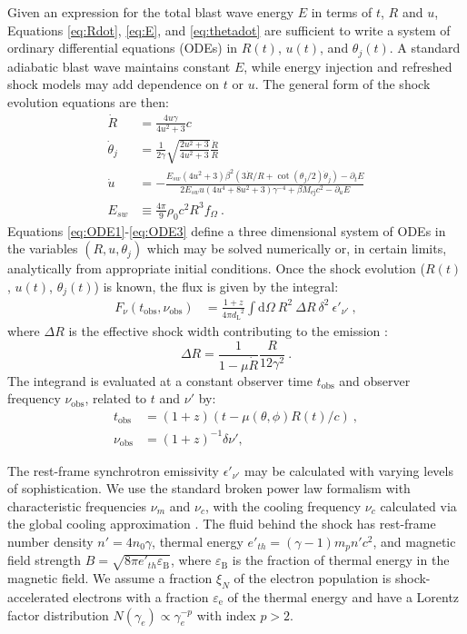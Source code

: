 \documentclass[twocolumn]{aastex62}
\newcommand{\dd}{\ensuremath{\mathrm{d}}}
\newcommand{\Mej}{\ensuremath{M_{\mathrm{ej}}}}
\newcommand{\tobs}{\ensuremath{t_{\mathrm{obs}}}}
\newcommand{\nuobs}{\ensuremath{\nu_{\mathrm{obs}}}}
\newcommand{\epse}{\ensuremath{\varepsilon_{\mathrm{e}}}}
\newcommand{\epsB}{\ensuremath{\varepsilon_{\mathrm{B}}}}
\newcommand{\xiN}{\ensuremath{\xi_N}}
\newcommand{\dL}{\ensuremath{d_{\mathrm{L}}}}
\begin{document}
Given an expression for the total blast wave energy $E$ in terms of $t$, $R$ and $u$, Equations \eqref{eq:Rdot}, \eqref{eq:E}, and \eqref{eq:thetadot} are sufficient to write a system of ordinary differential equations (ODEs) in $R(t)$, $u(t)$, and $\theta_j(t)$. A standard adiabatic blast wave maintains constant $E$, while energy injection and refreshed shock models may add dependence on $t$ or $u$. The general form of the shock evolution equations are then:
\begin{align}
	\dot{R} &= \frac{4 u \gamma}{4 u^2 +3}c  \label{eq:ODE1}\\
	\dot{\theta}_j &= \frac{1}{2\gamma}\sqrt{\frac{2u^2+3}{4u^2+3}} \frac{\dot{R}}{R}  \label{eq:ODE2} \\
	\dot{u} &= -\frac{E_{sw}(4u^2+3)\beta^2 (3\dot{R}/R + \cot (\theta_j/2) \dot{\theta}_j) - \partial_t E}{2 E_{sw} u (4u^4 + 8u^2 + 3)\gamma^{-4} + \beta \Mej c^2 - \partial_u E}  \label{eq:ODE3} \\
	E_{sw} &\equiv \frac{4\pi}{9} \rho_0 c^2 R^3 f_\Omega\ . \nonumber
\end{align}
Equations \eqref{eq:ODE1}-\eqref{eq:ODE3} define a three dimensional system of ODEs in the variables $(R, u, \theta_j)$ which may be solved numerically or, in certain limits, analytically from appropriate initial conditions.  Once the shock evolution ($R(t)$, $u(t)$, $\theta_j(t)$) is known, the flux is given by the integral:
\begin{align}
	F_\nu(\tobs, \nuobs) &= \frac{1+z}{4\pi \dL^2} \int \! \dd \Omega\ R^2\ \Delta R\  \delta^2\ \epsilon'_{\nu'} \ , \label{eq:flux2}
\end{align}
where $\Delta R$ is the effective shock width contributing to the emission \citep{van-Eerten:2010aa}:
\begin{equation}
	\Delta R = \frac{1}{1-\mu \dot{R}} \frac{R}{12\gamma^2} \ . \label{eq:dr}
\end{equation}
 The integrand is evaluated at a constant observer time $\tobs$ and observer frequency $\nuobs$, related to $t$ and $\nu'$ by:
\begin{align}
	\tobs &= (1+z) \left(t - \mu(\theta, \phi) R(t)/c\right)\ , \label{eq:tobs} \\
	\nuobs &= (1+z)^{-1} \delta \nu' , \label{eq:nuobs}
\end{align}

The rest-frame synchrotron emissivity $\epsilon'_{\nu'}$ may be calculated with varying levels of sophistication.  We use the standard broken power law formalism with characteristic frequencies $\nu_m$ and $\nu_c$, with the cooling frequency $\nu_c$ calculated via the global cooling approximation \citep{Granot:2002aa, van-Eerten:2010aa}.  The fluid behind the shock has rest-frame number density $n' = 4n_0\gamma$, thermal energy $e'_{th} = (\gamma-1)m_p n' c^2$, and magnetic field strength $B = \sqrt{8\pi e'_{th} \epsB}$, where $\epsB$ is the fraction of thermal energy in the magnetic field. We assume a fraction $\xiN$ of the electron population is shock-accelerated electrons with a fraction $\epse$ of the thermal energy and have a Lorentz factor distribution $N(\gamma_e) \propto \gamma_e^{-p}$ with index $p>2$.
\end{document}

